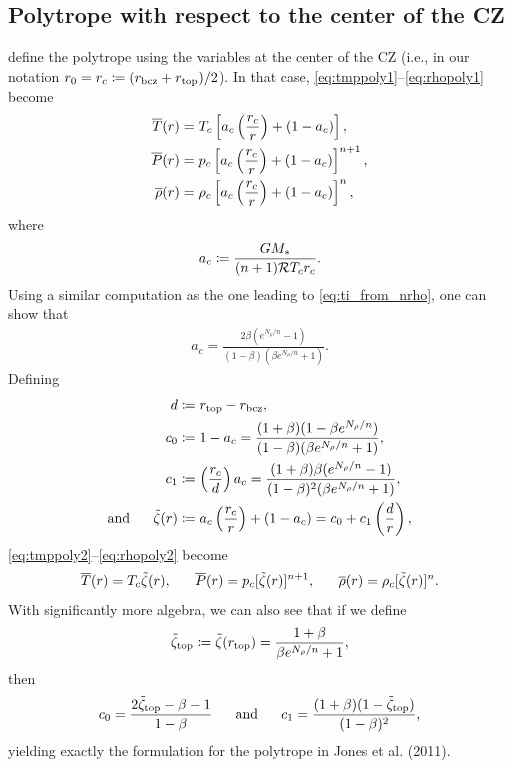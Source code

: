 \documentclass[12pt]{article} %
\begin{document}
\subsection{Polytrope with respect to the center of the CZ}
\citet{Jones2011} define the polytrope using the variables at the center of the CZ (i.e., in our notation $r_0=r_c\coloneqq(r_{\rm{bcz}}+r_{\rm{top}})/2$). In that case, \eqref{eq:tmppoly1}--\eqref{eq:rhopoly1} become
\begin{align}
	\overline{T}(r) &= T_c\left[a_c\left(\frac{r_c}{r}\right) + (1 - a_c)\right],\label{eq:tmppoly2}\\
	\overline{P}(r) &= p_c\left[a_c\left(\frac{r_c}{r}\right) + (1 - a_c)\right]^{n+1},\label{eq:ppoly2}\\
	\overline{\rho}(r) &= \rho_c\left[a_c\left(\frac{r_c}{r}\right) + (1 - a_c)\right]^n,\label{eq:rhopoly2}
\end{align} 
where 
\begin{align}
a_c \coloneqq \frac{GM_*}{(n+1)\mathcal{R} T_c r_c}.
\label{def:ac}
\end{align}
Using a similar computation as the one leading to \eqref{eq:ti_from_nrho}, one can show that 
\begin{align}
a_c = \frac{2\beta(e^{N_\rho/n}-1)}{(1-\beta)(\beta e^{N_\rho/n} + 1)}.
\label{eq:ac_fromn}
\end{align}
Defining 
\begin{align}
d&\coloneqq r_{\rm{top}}-r_{\rm{bcz}},\label{def:d}\\
c_0&\coloneqq 1-a_c = \frac{(1+\beta)(1-\beta e^{N_\rho/n})}{(1-\beta)(\beta e^{N_\rho/n} + 1)}, \label{def:c0}\\
c_1&\coloneqq \left(\frac{r_c}{d}\right)a_c = \frac{(1+\beta)\beta(e^{N_\rho/n}-1)}{(1-\beta)^2(\beta e^{N_\rho/n} + 1)},\label{def:c1}\\
\text{and}\ \ \ \ \  \tilde{\zeta}(r) &\coloneqq a_c\left(\frac{r_c}{r}\right) + (1-a_c) = c_0 + c_1\left(\frac{d}{r}\right),\label{def:tildezeta}
\end{align}
\eqref{eq:tmppoly2}--\eqref{eq:rhopoly2} become
\begin{align}
\tmpref\ofr=T_c\tilde{\zeta}(r),\ \ \ \ \ \prsref\ofr=p_c[\tilde{\zeta}(r)]^{n+1},\ \ \ \ \ \rhoref\ofr=\rho_c[\tilde{\zeta}(r)]^n. 
\label{eq:polytrope3}
\end{align}
With significantly more algebra, we can also see that if we define
\begin{align}
\tilde{\zeta}_{\rm{top}} \coloneqq \tilde{\zeta}(r_{\rm{top}}) = \frac{1+\beta}{\beta e^{N_\rho/n} + 1}, 
\end{align}
then 
\begin{align}
c_0 = \frac{2\tilde{\zeta}_{\rm{top}} - \beta - 1}{1-\beta} \ \ \ \ \ \text{and}\ \ \ \ \  c_1 = \frac{(1+\beta)(1-\tilde{\zeta}_{\rm{top}})}{(1-\beta)^2},
\label{eq:c01_from_zeta0}
\end{align}
yielding exactly the formulation for the polytrope in Jones et al. (2011). 
\end{document}
